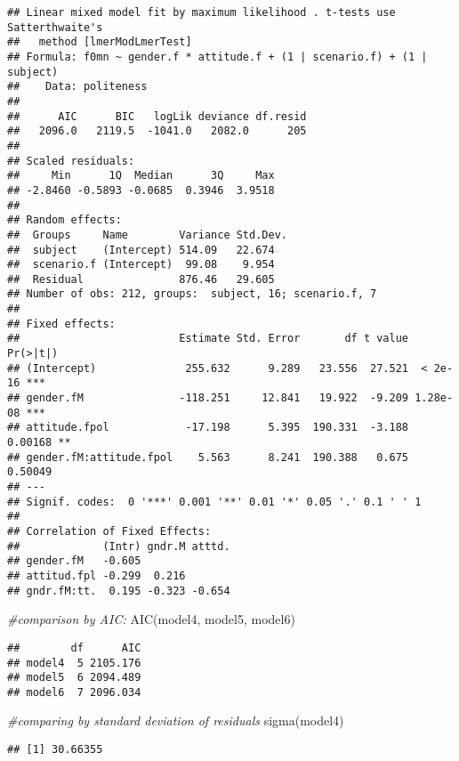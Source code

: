 \documentclass[
]{article}
\newenvironment{Shaded}{\begin{snugshade}}{\end{snugshade}}
\newcommand{\CommentTok}[1]{\textcolor[rgb]{0.56,0.35,0.01}{\textit{#1}}}
\newcommand{\FunctionTok}[1]{\textcolor[rgb]{0.00,0.00,0.00}{#1}}
\newcommand{\NormalTok}[1]{#1}
\begin{document}
\begin{verbatim}
## Linear mixed model fit by maximum likelihood . t-tests use Satterthwaite's
##   method [lmerModLmerTest]
## Formula: f0mn ~ gender.f * attitude.f + (1 | scenario.f) + (1 | subject)
##    Data: politeness
## 
##      AIC      BIC   logLik deviance df.resid 
##   2096.0   2119.5  -1041.0   2082.0      205 
## 
## Scaled residuals: 
##     Min      1Q  Median      3Q     Max 
## -2.8460 -0.5893 -0.0685  0.3946  3.9518 
## 
## Random effects:
##  Groups     Name        Variance Std.Dev.
##  subject    (Intercept) 514.09   22.674  
##  scenario.f (Intercept)  99.08    9.954  
##  Residual               876.46   29.605  
## Number of obs: 212, groups:  subject, 16; scenario.f, 7
## 
## Fixed effects:
##                         Estimate Std. Error       df t value Pr(>|t|)    
## (Intercept)              255.632      9.289   23.556  27.521  < 2e-16 ***
## gender.fM               -118.251     12.841   19.922  -9.209 1.28e-08 ***
## attitude.fpol            -17.198      5.395  190.331  -3.188  0.00168 ** 
## gender.fM:attitude.fpol    5.563      8.241  190.388   0.675  0.50049    
## ---
## Signif. codes:  0 '***' 0.001 '**' 0.01 '*' 0.05 '.' 0.1 ' ' 1
## 
## Correlation of Fixed Effects:
##             (Intr) gndr.M atttd.
## gender.fM   -0.605              
## attitud.fpl -0.299  0.216       
## gndr.fM:tt.  0.195 -0.323 -0.654
\end{verbatim}

\begin{Shaded}
\begin{Highlighting}[]
\CommentTok{\#comparison by AIC:}
\FunctionTok{AIC}\NormalTok{(model4, model5, model6)}
\end{Highlighting}
\end{Shaded}

\begin{verbatim}
##        df      AIC
## model4  5 2105.176
## model5  6 2094.489
## model6  7 2096.034
\end{verbatim}

\begin{Shaded}
\begin{Highlighting}[]
\CommentTok{\#comparing by standard deviation of residuals}
\FunctionTok{sigma}\NormalTok{(model4)}
\end{Highlighting}
\end{Shaded}

\begin{verbatim}
## [1] 30.66355
\end{verbatim}
\end{document}
